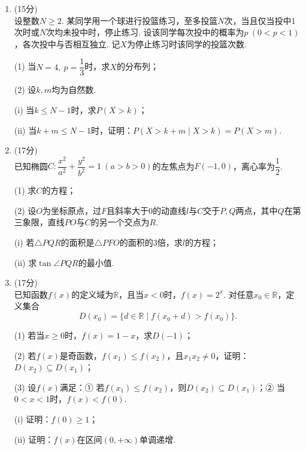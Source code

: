 \documentclass[12pt,a4paper]{article}
\begin{document}
\begin{enumerate}[leftmargin=*,label=\arabic*.,resume,itemsep=1.2ex]
		\item (15分)\\
		设整数$N\ge2$. 某同学用一个球进行投篮练习，至多投篮$N$次，当且仅当投中1次时或$N$次均未投中时，停止练习. 设该同学每次投中的概率为$p\ (0<p<1)$，各次投中与否相互独立. 记$X$为停止练习时该同学的投篮次数.
		
		(1) 当$N=4,\ p=\dfrac13$时，求$X$的分布列；
		
		(2) 设$k,m$均为自然数.
		
		\hspace*{2em}(i) 当$k\le N-1$时，求$P(X>k)$；
		
		\hspace*{2em}(ii) 当$k+m\le N-1$时，证明：$P(X>k+m\mid X>k)=P(X>m)$.
		
		\newpage
		
		\item (17分)\\
		已知椭圆$C:\dfrac{x^2}{a^2}+\dfrac{y^2}{b^2}=1\ (a>b>0)$的左焦点为$F(-1,0)$，离心率为$\dfrac12$.
		
		(1) 求$C$的方程；
		
		(2) 设$O$为坐标原点，过$F$且斜率大于$0$的动直线$l$与$C$交于$P,Q$两点，其中$Q$在第三象限，直线$PO$与$C$的另一个交点为$R$.
		
		\hspace*{2em}(i) 若$\triangle PQR$的面积是$\triangle PFO$的面积的$3$倍，求$l$的方程；
		
		\hspace*{2em}(ii) 求$\tan\angle PQR$的最小值.
		
		\newpage
		
		\item (17分)\\
		已知函数$f(x)$的定义域为$\mathbb{R}$，且当$x<0$时，$f(x)=2^x$. 对任意$x_0\in\mathbb{R}$，定义集合
		\[
		D(x_0)=\{d\in\mathbb{R}\mid f(x_0+d)>f(x_0)\}.
		\]
		
		(1) 若当$x\ge0$时，$f(x)=1-x$，求$D(-1)$；
		
		(2) 若$f(x)$是奇函数，$f(x_1)\le f(x_2)$，且$x_1x_2\ne0$，证明：$D(x_2)\subseteq D(x_1)$；
		
		(3) 设$f(x)$满足：① 若$f(x_1)\le f(x_2)$，则$D(x_2)\subseteq D(x_1)$；② 当$0<x<1$时，$f(x)<f(0)$.
		
		\hspace*{2em}(i) 证明：$f(0)\ge1$；
		
		\hspace*{2em}(ii) 证明：$f(x)$在区间$(0,+\infty)$单调递增.
		
		\vspace{0.9\textheight}
		
	\end{enumerate}
	
\end{document}
